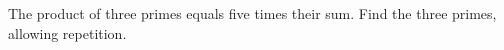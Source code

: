 The product of three primes equals five times their sum. Find the three primes, allowing repetition.
